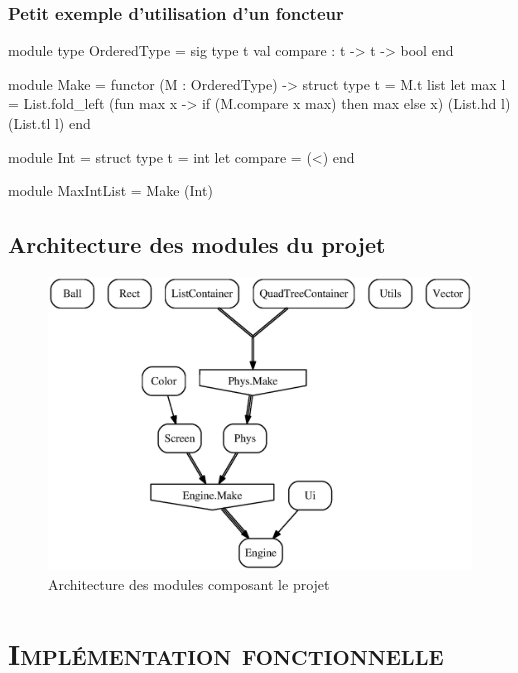 \documentclass[xcolor=x11names,compress,11pt]{beamer}
\renewcommand{\(}{\begin{columns}}
\renewcommand{\)}{\end{columns}}
\newcommand{\<}[1]{\begin{column}{#1}}
\renewcommand{\>}{\end{column}}
\begin{document}
\begin{frame}[fragile]
  \frametitle{\small Petit exemple d'utilisation d'un foncteur}

\begin{ocamlcode}
module type OrderedType = sig
  type t
  val compare : t -> t -> bool
end

module Make = functor (M : OrderedType) ->
struct
  type t = M.t list
  let max l = List.fold_left
    (fun max x -> if (M.compare x max) then max else x)
    (List.hd l) (List.tl l)
end

module Int = struct
  type t = int
  let compare = (<)
end

module MaxIntList = Make (Int)
\end{ocamlcode}

\end{frame}

\subsection*{Architecture des modules du projet}
\begin{frame}
  \begin{figure}[h]
    \centering
    \includegraphics[scale=0.45]{modules.eps}
    \caption{Architecture des modules composant le projet}
  \end{figure}

\end{frame}

\section{\scshape Implémentation fonctionnelle}
\end{document}
